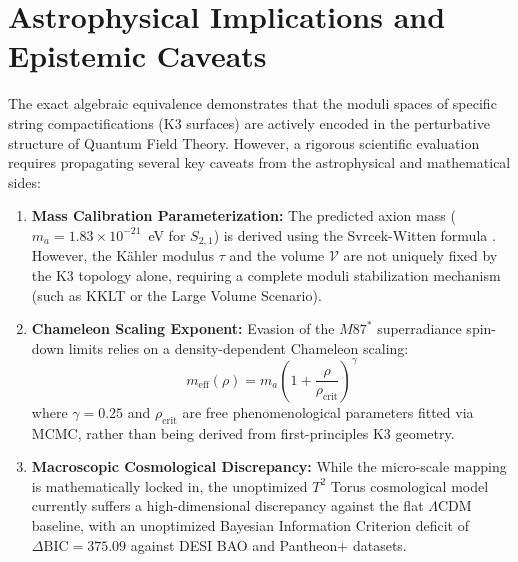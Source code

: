 \documentclass[11pt,a4paper]{article}
\begin{document}
\section{Astrophysical Implications and Epistemic Caveats}
The exact algebraic equivalence demonstrates that the moduli spaces of specific string compactifications (K3 surfaces) are actively encoded in the perturbative structure of Quantum Field Theory. However, a rigorous scientific evaluation requires propagating several key caveats from the astrophysical and mathematical sides:
\begin{enumerate}
    \item \textbf{Mass Calibration Parameterization:} The predicted axion mass ($m_a = 1.83 \times 10^{-21}$~eV for $S_{2,1}$) is derived using the Svrcek-Witten formula \cite{svrcek2006axions}. However, the K\"{a}hler modulus $\tau$ and the volume $\mathcal{V}$ are not uniquely fixed by the K3 topology alone, requiring a complete moduli stabilization mechanism (such as KKLT or the Large Volume Scenario).
    \item \textbf{Chameleon Scaling Exponent:} Evasion of the $M87^*$ superradiance spin-down limits \cite{detweiler1980klein, eht2019first} relies on a density-dependent Chameleon scaling:
    \begin{equation}
    m_{\text{eff}}(\rho) = m_a \left(1 + \frac{\rho}{\rho_{\text{crit}}}\right)^{\gamma}
    \end{equation}
    where $\gamma = 0.25$ and $\rho_{\text{crit}}$ are free phenomenological parameters fitted via MCMC, rather than being derived from first-principles K3 geometry.
    \item \textbf{Macroscopic Cosmological Discrepancy:} While the micro-scale mapping is mathematically locked in, the unoptimized $T^2$ Torus cosmological model currently suffers a high-dimensional discrepancy against the flat $\Lambda$CDM baseline, with an unoptimized Bayesian Information Criterion deficit of $\Delta\text{BIC} = 375.09$ against DESI BAO and Pantheon+ datasets.
\end{enumerate}
\end{document}
